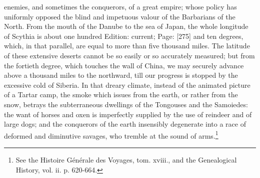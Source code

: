 enemies, and sometimes the conquerors, of a great empire; whose policy has uniformly opposed the blind and impetuous valour of the Barbarians of the North. From the mouth of the Danube to the sea of Japan, the whole longitude of Scythia is about one hundred Edition: current; Page: [275] and ten degrees, which, in that parallel, are equal to more than five thousand miles. The latitude of these extensive deserts cannot be so easily or so accurately measured; but from the fortieth degree, which touches the wall of China, we may securely advance above a thousand miles to the northward, till our progress is stopped by the excessive cold of Siberia. In that dreary climate, instead of the animated picture of a Tartar camp, the smoke which issues from the earth, or rather from the snow, betrays the subterraneous dwellings of the Tongouses and the Samoiedes: the want of horses and oxen is imperfectly supplied by the use of reindeer and of large dogs; and the conquerors of the earth insensibly degenerate into a race of deformed and diminutive savages, who tremble at the sound of arms.\footnote{See the Histoire Générale des Voyages, tom. xviii., and the Genealogical History, vol. ii. p. 620-664.}

